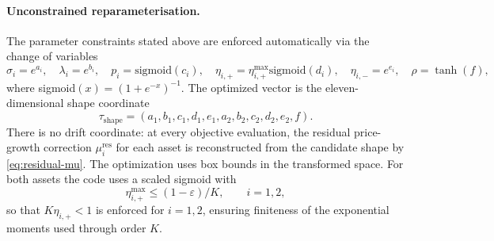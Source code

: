 \documentclass[11pt]{article}
\begin{document}
\paragraph{Unconstrained reparameterisation.}
The parameter constraints stated above are enforced automatically via the
change of variables
\begin{equation}\label{eq:reparam}
\sigma_i=e^{a_i},\quad
\lambda_i=e^{b_i},\quad
p_i=\mathrm{sigmoid}(c_i),\quad
\eta_{i,+}=\eta_{i,+}^{\max}\mathrm{sigmoid}(d_i),\quad
\eta_{i,-}=e^{e_i},\quad
\rho=\tanh(f),
\end{equation}
where sigmoid$(x)=(1+e^{-x})^{-1}$.
The optimized vector is the eleven-dimensional shape coordinate
\[
\tau_{\mathrm{shape}}
=(a_1,b_1,c_1,d_1,e_1,a_2,b_2,c_2,d_2,e_2,f).
\]
There is no drift coordinate: at every objective evaluation, the residual price-growth
correction $\mu_i^{\mathrm{res}}$ for each asset is reconstructed from the candidate shape
by \eqref{eq:residual-mu}. The optimization uses
box bounds in the transformed space. For both assets the code uses
a scaled sigmoid with
\[
\eta_{i,+}^{\max}\le (1-\varepsilon)/K,
\qquad i=1,2,
\]
so that $K\eta_{i,+}<1$ is enforced for $i=1,2$, ensuring finiteness of the
exponential moments used through order $K$.
\end{document}
